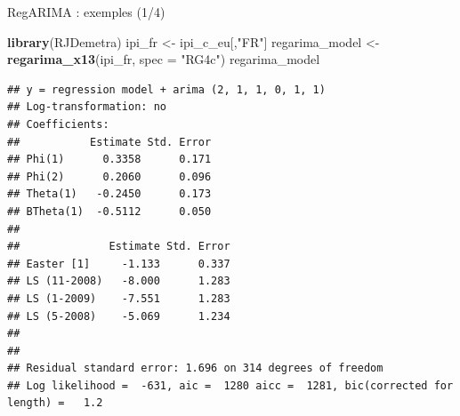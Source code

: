 \documentclass[10pt,xcolor=table,color={dvipsnames,usenames},ignorenonframetext,usepdftitle=false,french]{beamer}
\newenvironment{Shaded}{\begin{snugshade}}{\end{snugshade}}
\newcommand{\DataTypeTok}[1]{\textcolor[rgb]{0.13,0.29,0.53}{#1}}
\newcommand{\KeywordTok}[1]{\textcolor[rgb]{0.13,0.29,0.53}{\textbf{#1}}}
\newcommand{\NormalTok}[1]{#1}
\newcommand{\StringTok}[1]{\textcolor[rgb]{0.31,0.60,0.02}{#1}}
\begin{document}
\begin{frame}[fragile]{RegARIMA : exemples (1/4)}
\protect\hypertarget{regarima-exemples-14}{}

\begin{Shaded}
\begin{Highlighting}[]
\KeywordTok{library}\NormalTok{(RJDemetra)}
\NormalTok{ipi_fr <-}\StringTok{ }\NormalTok{ipi_c_eu[,}\StringTok{"FR"}\NormalTok{]}
\NormalTok{regarima_model <-}\StringTok{ }\KeywordTok{regarima_x13}\NormalTok{(ipi_fr, }\DataTypeTok{spec =} \StringTok{"RG4c"}\NormalTok{)}
\NormalTok{regarima_model}
\end{Highlighting}
\end{Shaded}

\begin{verbatim}
## y = regression model + arima (2, 1, 1, 0, 1, 1)
## Log-transformation: no
## Coefficients:
##           Estimate Std. Error
## Phi(1)      0.3358      0.171
## Phi(2)      0.2060      0.096
## Theta(1)   -0.2450      0.173
## BTheta(1)  -0.5112      0.050
## 
##              Estimate Std. Error
## Easter [1]     -1.133      0.337
## LS (11-2008)   -8.000      1.283
## LS (1-2009)    -7.551      1.283
## LS (5-2008)    -5.069      1.234
## 
## 
## Residual standard error: 1.696 on 314 degrees of freedom
## Log likelihood =  -631, aic =  1280 aicc =  1281, bic(corrected for length) =   1.2
\end{verbatim}

\end{frame}
\end{document}
